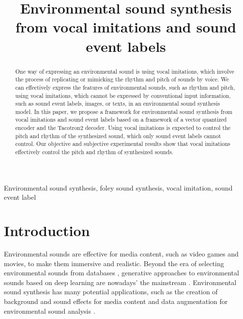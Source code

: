 \documentclass{article}
\title{Environmental sound synthesis \\from vocal imitations and sound event labels}
\begin{document}
\ninept
%
\maketitle
\setlength{\abovedisplayskip}{3pt} %
\setlength{\belowdisplayskip}{2pt} %
\setlength{\tabcolsep}{0.8mm} 
%
\begin{abstract}
\vspace{-3pt}
One way of expressing an environmental sound is using vocal imitations, which involve the process of replicating or mimicking the rhythm and pitch of sounds by voice.
We can effectively express the features of environmental sounds, such as rhythm and pitch, using vocal imitations, which cannot be expressed by conventional input information, such as sound event labels, images, or texts, in an environmental sound synthesis model.
In this paper, we propose a framework for environmental sound synthesis from vocal imitations and sound event labels based on a framework of a vector quantized encoder and the Tacotron2 decoder.
Using vocal imitations is expected to control the pitch and rhythm of the synthesized sound, which only sound event labels cannot control.
Our objective and subjective experimental results show that vocal imitations effectively control the pitch and rhythm of synthesized sounds. 
\end{abstract}
%
\begin{keywords}
Environmental sound synthesis, foley sound synthesis, vocal imitation, sound event label
\end{keywords}
%

\vspace{-3pt}
\section{Introduction}
\vspace{-3pt}
\label{sec:intro}
Environmental sounds are effective for media content, such as video games and movies, to make them immersive and realistic.
Beyond the era of selecting environmental sounds from databases \cite{Gemmeke_ICASSP_2017,Fonseca_TASLP_2021}, generative approaches to environmental sounds based on deep learning are nowadays' the mainstream \cite{Kong_ICASSP2019,Zhou_CVPR_2018,Chen_TIP_2020}.
Environmental sound synthesis has many potential applications, such as the creation of background and sound effects for media content \cite{Zhou_CVPR_2018,Lloyd_ACMI3DGG_01} and data augmentation for environmental sound analysis \cite{Kong_ICASSP2019,Lloyd_ACMI3DGG_01,Gontier_ICASSP_2020,Salamon_WASPAA2017_01}.
\end{document}
